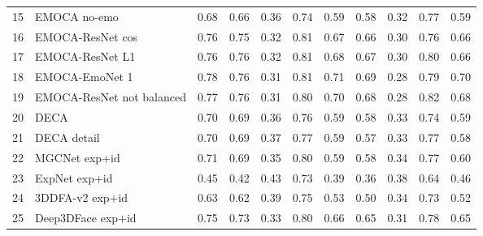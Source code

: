 \begin{tabular}{llrrrrrrrrr}
15 &               EMOCA no-emo &   0.68 &   0.66 &    0.36 &    0.74 &   0.59 &   0.58 &    0.32 &    0.77 &      0.59 \\
16 &           EMOCA-ResNet cos &   0.76 &   0.75 &    0.32 &    0.81 &   0.67 &   0.66 &    0.30 &    0.76 &      0.66 \\
17 &            EMOCA-ResNet L1 &   0.76 &   0.76 &    0.32 &    0.81 &   0.68 &   0.67 &    0.30 &    0.80 &      0.66 \\
18 &             EMOCA-EmoNet 1 &   0.78 &   0.76 &    0.31 &    0.81 &   0.71 &   0.69 &    0.28 &    0.79 &      0.70 \\
19 &  EMOCA-ResNet not balanced &   0.77 &   0.76 &    0.31 &    0.80 &   0.70 &   0.68 &    0.28 &    0.82 &      0.68 \\
20 &                       DECA &   0.70 &   0.69 &    0.36 &    0.76 &   0.59 &   0.58 &    0.33 &    0.74 &      0.59 \\
21 &                DECA detail &   0.70 &   0.69 &    0.37 &    0.77 &   0.59 &   0.57 &    0.33 &    0.77 &      0.58 \\
22 &              MGCNet exp+id &   0.71 &   0.69 &    0.35 &    0.80 &   0.59 &   0.58 &    0.34 &    0.77 &      0.60 \\
23 &              ExpNet exp+id &   0.45 &   0.42 &    0.43 &    0.73 &   0.39 &   0.36 &    0.38 &    0.64 &      0.46 \\
24 &            3DDFA-v2 exp+id &   0.63 &   0.62 &    0.39 &    0.75 &   0.53 &   0.50 &    0.34 &    0.73 &      0.52 \\
25 &          Deep3DFace exp+id &   0.75 &   0.73 &    0.33 &    0.80 &   0.66 &   0.65 &    0.31 &    0.78 &      0.65 \\
\bottomrule
\end{tabular}
